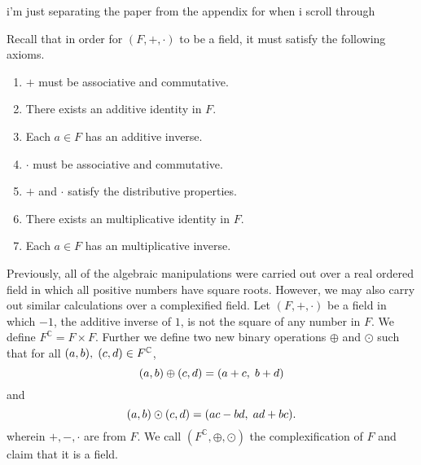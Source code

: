 \documentclass[12pt]{article}
\newcommand{\C}{\mathbb{C}}
\newcommand{\ttc}{, \hspace{1mm}}
\begin{document}
\newpage 
i'm just separating the paper from the appendix for when i scroll through


\newpage 

Recall that in order for $(F,+,\cdot)$ to be a field, it must satisfy the following axioms.
\begin{enumerate}
	\item $+$ must be associative and commutative.
	\item There exists an additive identity in $F$.
	\item Each $a\in F$ has an additive inverse.
	\item $\cdot$ must be associative and commutative.
	\item $+$ and $\cdot$ satisfy the distributive properties.
	\item There exists an multiplicative identity in $F$.
	\item Each $a\in F$ has an multiplicative inverse.
\end{enumerate}
Previously, all of the algebraic manipulations were carried out over a real ordered field in which all positive numbers have square roots. However, we may also carry out similar calculations over a complexified field. Let $(F,+,\cdot)$ be a field in which $-1$, the additive inverse of $1$, is not the square of any number in $F$. We define $F^\C = F\times F$. Further we define two new binary operations $\oplus$ and $\odot$ such that for all $(a,b)\ttc (c,d)\in F^\C$,
	\[
		(a,b)\oplus(c,d) = (a + c\ttc b + d)
	\]
and
	\[
		(a,b)\odot(c,d) = (ac - bd\ttc ad + bc).
	\]
wherein $+,-,\cdot$ are from $F$. We call $(F^\C,\oplus,\odot)$ the complexification of $F$ and claim that it is a field. 
\end{document}
